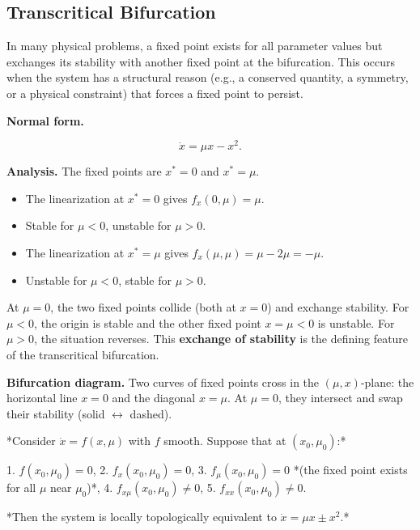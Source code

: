 \subsection{Transcritical Bifurcation}\label{sec:5.2.2}

In many physical problems, a fixed point exists for all parameter values but exchanges its stability with another fixed point at the bifurcation. This occurs when the system has a structural reason (e.g., a conserved quantity, a symmetry, or a physical constraint) that forces a fixed point to persist.

\textbf{Normal form.}

\begin{equation}\label{eq:5.2}\tag{5.2}
\dot{x} = \mu x - x^2.
\end{equation}

\textbf{Analysis.} The fixed points are $x^* = 0$ and $x^* = \mu$.

\begin{itemize}[nosep]
  \item The linearization at $x^* = 0$ gives $f_x(0, \mu) = \mu$.
  \item Stable for $\mu < 0$, unstable for $\mu > 0$.
  \item The linearization at $x^* = \mu$ gives $f_x(\mu, \mu) = \mu - 2\mu = -\mu$.
  \item Unstable for $\mu < 0$, stable for $\mu > 0$.
\end{itemize}

At $\mu = 0$, the two fixed points collide (both at $x = 0$) and exchange stability. For $\mu < 0$, the origin is stable and the other fixed point $x = \mu < 0$ is unstable. For $\mu > 0$, the situation reverses. This \textbf{exchange of stability} is the defining feature of the transcritical bifurcation.

\textbf{Bifurcation diagram.} Two curves of fixed points cross in the $(\mu, x)$-plane: the horizontal line $x = 0$ and the diagonal $x = \mu$. At $\mu = 0$, they intersect and swap their stability (solid $\leftrightarrow$ dashed).

\begin{theorem}\label{thm:5.3}
*Consider $\dot{x} = f(x, \mu)$ with $f$ smooth. Suppose that at $(x_0, \mu_0)$:*

1. $f(x_0, \mu_0) = 0$,
2. $f_x(x_0, \mu_0) = 0$,
3. $f_\mu(x_0, \mu_0) = 0$ *(the fixed point exists for all $\mu$ near $\mu_0$)*,
4. $f_{x\mu}(x_0, \mu_0) \neq 0$,
5. $f_{xx}(x_0, \mu_0) \neq 0$.

*Then the system is locally topologically equivalent to $\dot{x} = \mu x \pm x^2$.*
\end{theorem}


